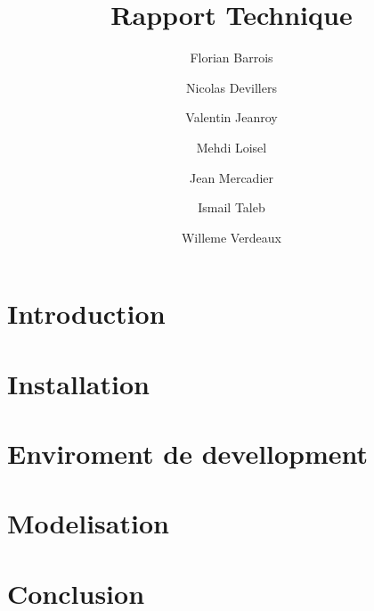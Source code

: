 \documentclass[a4paper,10pt]{report}
\title{Rapport Technique}
\author{Florian Barrois \and Nicolas Devillers \and Valentin Jeanroy \and Mehdi Loisel \and Jean Mercadier \and Ismail Taleb \and Willeme Verdeaux}
\begin{document}
\thispagestyle{headings}

\maketitle

\tableofcontents

\chapter*{Introduction}

\chapter{Installation}


\chapter{Enviroment de devellopment}


\chapter{Modelisation}

\chapter*{Conclusion}
\end{document}
